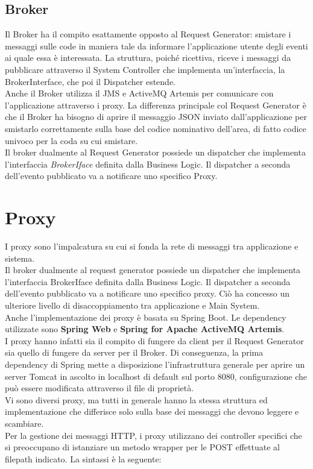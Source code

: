 \subsection{Broker}
Il Broker ha il compito esattamente opposto al Request Generator: smistare i messaggi sulle code in maniera tale da informare l'applicazione utente degli eventi ai quale essa è interessata. 
La struttura, poiché ricettiva, riceve i messaggi da pubblicare attraverso il System Controller che implementa un'interfaccia, la BrokerInterface, che poi il Dispatcher estende. \vspace{0.5cm}
\\Anche il Broker utilizza il JMS e ActiveMQ Artemis per comunicare con l'applicazione attraverso i proxy. La differenza principale col Request Generator è che il Broker ha bisogno di aprire il messaggio JSON inviato dall'applicazione per smistarlo correttamente sulla base del codice nominativo dell'area, di fatto codice univoco per la coda su cui smistare.
\\Il broker dualmente al Request Generator possiede un dispatcher che implementa l'interfaccia \textit{BrokerIface} definita dalla Business Logic.
Il dispatcher a seconda dell'evento pubblicato va a notificare uno specifico Proxy.

\section{Proxy}
I proxy sono l'impalcatura su cui si fonda la rete di messaggi tra applicazione e sistema. 
\\Il broker dualmente al request generator possiede un dispatcher che implementa l'interfaccia BrokerIface definita dalla Business Logic. Il dispatcher a seconda dell'evento pubblicato va a notificare uno specifico proxy. Ciò ha concesso un ulteriore livello di disaccoppiamento tra applicazione e Main System. \vspace{0.5cm}
\\Anche l'implementazione dei proxy è basata su Spring Boot. Le dependency utilizzate sono \textbf{Spring Web} e \textbf{Spring for Apache ActiveMQ Artemis}. 
\\I proxy hanno infatti sia il compito di fungere da client per il Request Generator sia quello di fungere da server per il Broker. Di conseguenza, la prima dependency di Spring mette a disposizione l'infrastruttura generale per aprire un server Tomcat in ascolto in localhost di default sul porto 8080, configurazione che può essere modificata attraverso il file di proprietà.
\\Vi sono diversi proxy, ma tutti in generale hanno la stessa struttura ed implementazione che differisce solo sulla base dei messaggi che devono leggere e scambiare. \vspace{0.5cm}
\\Per la gestione dei messaggi HTTP, i proxy utilizzano dei controller specifici che si preoccupano di istanziare un metodo wrapper per le POST effettuate al filepath indicato. La sintassi è la seguente:

